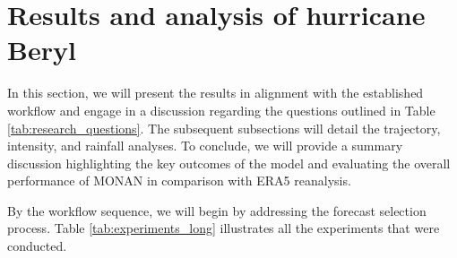 
\section{Results and analysis of hurricane Beryl}

In this section, we will present the results in alignment with the established workflow and engage in a discussion regarding the questions outlined in Table \ref{tab:research_questions}. The subsequent subsections will detail the trajectory, intensity, and rainfall analyses. To conclude, we will provide a summary discussion highlighting the key outcomes of the model and evaluating the overall performance of MONAN in comparison with ERA5 reanalysis.

By the workflow sequence, we will begin by addressing the forecast selection process. Table \ref{tab:experiments_long} illustrates all the experiments that were conducted.


